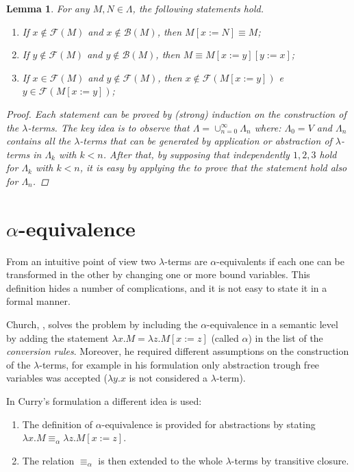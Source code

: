 \documentclass[a4paper,11pt]{article}
\newtheorem{lemma}{Lemma}
\theoremstyle{definition}
\newcommand{\FF}{\mathcal{F}}
\newcommand{\BB}{\mathcal{B}}
\begin{document}
\begin{lemma}
  For any $M,N\in\Lambda$, the following statements hold.
  \begin{enumerate}
    \item If $x\not\in\FF(M)$ and $x\not\in\BB(M)$, then $M[x:=N]\equiv M$;
    \item If $y\not\in\FF(M)$ and $y\not\in\BB(M)$, then $M\equiv M[x:=y][y:=x]$;
    \item If $x\in\FF(M)$ and $y\not\in\FF(M)$, then $x\not\in\FF(M[x:=y])$ e
      $y\in\FF(M[x:=y])$;
  \end{enumerate}
  \label{lem:sost}
  \begin{proof}
    Each statement can be proved by (strong) induction on the construction of the
    $\lambda$-terms. The key idea is to observe that $\Lambda =
    \cup_{n=0}^\infty\Lambda_n$ where: $\Lambda_0=V$ and $\Lambda_n$ contains all the
    $\lambda$-terms that can be generated by application or abstraction of $\lambda$-terms 
    in $\Lambda_k$ with $k<n$. After that, by supposing that independently $1,2,3$ hold
    for $\Lambda_k$ with $k<n$, it is easy by applying the 
    to prove that the statement hold also for $\Lambda_n$.
  \end{proof}
\end{lemma}

\section{$\alpha$-equivalence}
From an intuitive point of view two $\lambda$-terms are $\alpha$-equivalents
if each one can be transformed in the other by changing one or more bound
variables. This definition hides a number of complications, and it is not
easy to state it in a formal manner. 

Church, \cite{Church}, solves the problem by including the $\alpha$-equivalence in a semantic
level by adding the statement $\lambda x.M = \lambda z.M[x:=z]$ (called
$\alpha$) in the list of the \textit{conversion rules}. Moreover, 
he required different assumptions on the construction of the
$\lambda$-terms, for example in his formulation only abstraction trough free
variables was accepted ($\lambda y.x$ is not considered a $\lambda$-term).

In Curry's formulation \cite{Curry} a different idea is used: 
\begin{enumerate}
  \item The definition of $\alpha$-equivalence is provided for abstractions
    by stating $\lambda x.M \equiv_\alpha \lambda z.M[x:=z]$. 
  \item The relation $\equiv_\alpha$ is then extended to the whole
$\lambda$-terms by transitive closure. 
\end{enumerate}
\end{document}
